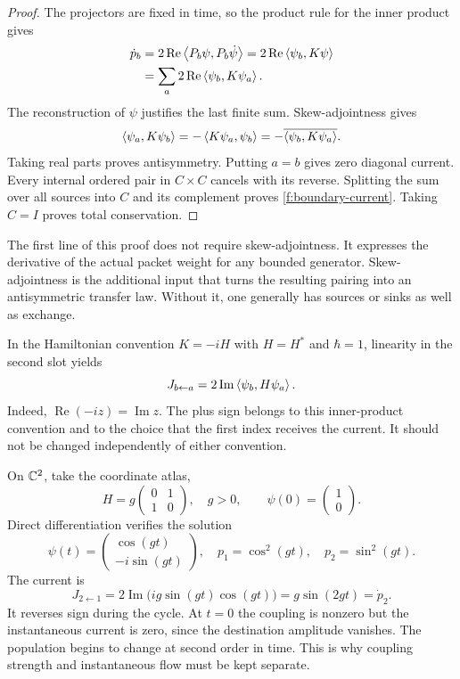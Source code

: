 \begin{proof}
The projectors are fixed in time, so the product rule for the inner product gives
\begin{align*}
 \dot p_b
 &=2\operatorname{Re}\left\langle P_b\psi,P_b\dot\psi\right\rangle
 =2\operatorname{Re}\left\langle\psi_b,K\psi\right\rangle\\
 &=\sum_a2\operatorname{Re}\left\langle\psi_b,K\psi_a\right\rangle.
\end{align*}
The reconstruction of $\psi$ justifies the last finite sum. Skew-adjointness gives
\[
 \left\langle\psi_a,K\psi_b\right\rangle
 =-\left\langle K\psi_a,\psi_b\right\rangle
 =-\overline{\left\langle\psi_b,K\psi_a\right\rangle}.
\]
Taking real parts proves antisymmetry. Putting $a=b$ gives zero diagonal current. Every internal ordered pair in $C\times C$ cancels with its reverse. Splitting the sum over all sources into $C$ and its complement proves \eqref{f:boundary-current}. Taking $C=I$ proves total conservation.
\end{proof}

The first line of this proof does not require skew-adjointness. It expresses the derivative of the actual packet weight for any bounded generator. Skew-adjointness is the additional input that turns the resulting pairing into an antisymmetric transfer law. Without it, one generally has sources or sinks as well as exchange.

In the Hamiltonian convention $K=-iH$ with $H=H^*$ and $\hbar=1$, linearity in the second slot yields
\begin{equation}\label{f:hamiltonian-current}
 J_{b\leftarrow a}
 =2\operatorname{Im}\left\langle\psi_b,H\psi_a\right\rangle.
\end{equation}
Indeed, $\operatorname{Re}(-iz)=\operatorname{Im}z$. The plus sign belongs to this inner-product convention and to the choice that the first index receives the current. It should not be changed independently of either convention.

\begin{example}\label{f:rabi}
On $\mathbb C^2$, take the coordinate atlas,
\[
 H=g\begin{pmatrix}0&1\\1&0\end{pmatrix},\quad g>0,
 \qquad \psi(0)=\begin{pmatrix}1\\0\end{pmatrix}.
\]
Direct differentiation verifies the solution
\[
 \psi(t)=\begin{pmatrix}\cos(gt)\\-i\sin(gt)\end{pmatrix},
 \quad p_1=\cos^2(gt),\quad p_2=\sin^2(gt).
\]
The current is
\[
 J_{2\leftarrow1}
 =2\operatorname{Im}\bigl(i g\sin(gt)\cos(gt)\bigr)
 =g\sin(2gt)=\dot p_2.
\]
It reverses sign during the cycle. At $t=0$ the coupling is nonzero but the instantaneous current is zero, since the destination amplitude vanishes. The population begins to change at second order in time. This is why coupling strength and instantaneous flow must be kept separate.
\end{example}

